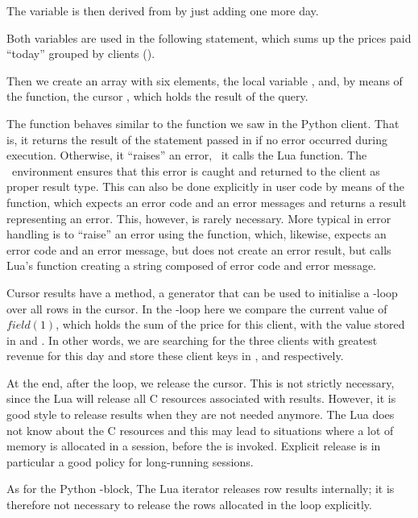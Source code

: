 The variable  is then derived from 
by just adding one more day.

Both variables are used in the following
 statement, which sums up the prices
paid ``today'' grouped by clients ().

Then we create an array with six elements, the local
variable , and, by means of the 
function, the cursor , which holds the result
of the query.

The function  behaves similar to
the  function we saw in the Python client.
That is, it returns the result of the statement passed in
if no error occurred during execution.
Otherwise, it ``raises'' an error, \ie\ it calls the Lua
 function.
The \nowdb\ environment ensures that this error is
caught and returned to the client as proper result type.
This can also be done explicitly in user code by means
of the  function, which expects an
error code and an error messages and returns a result
representing an error. This, however, is rarely necessary.
More typical in error handling is to ``raise'' an error
using the  function, which, likewise,
expects an error code and an error message, but does
not create an error result, but calls Lua's
 function creating a string composed
of error code and error message.

Cursor results have a  method,
a generator that can be used to initialise
a -loop over all rows in the cursor.
In the -loop here we compare the current
value of $field(1)$, which holds the sum of the price
for this client, with the value stored in
 and . In other words,
we are searching for the three clients with
greatest revenue for this day and store these
client keys in ,  and
 respectively.

At the end, after the loop, we release the cursor.
This is not strictly necessary, since the Lua 
will release all C resources associated with results.
However, it is good style to release results when they
are not needed anymore. The Lua  does not
know about the C resources and this may lead to situations
where a lot of memory is allocated in a session,
before the  is invoked.
Explicit release is in particular
a good policy for long-running sessions.

As for the Python -block,
The Lua iterator releases row results internally;
it is therefore not necessary to release
the rows allocated in the loop explicitly.

